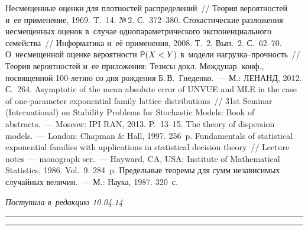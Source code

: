 \begin{multicols}{2}
{{\begin{thebibliography}{99}
 Несмещенные оценки
  для плотностей распределений~// Теория вероятностей и~ее применение,
  1969.  T.~14. №\,2.  С.~372--380.
 Стохастические разложения несмещенных оценок в~случае однопараметрического экспоненциального семейства~//
 Информатика и~её применения, 2008. Т.~2. Вып.~2. С.~62--70.
 О~несмещенной оценке вероятности
  ${\sf P}(X<Y)$ в~модели на\-груз\-ка--проч\-ность~//
  Теория вероятностей  и~ее приложения: Тезисы докл.
  Междунар. конф., посвященной 100-ле\-тию со дня
  рождения Б.\,В.~Гнеденко.~--- М.: ЛЕНАНД, 2012. С.~264.
 Asymptotic of the mean absolute error of UNVUE
 and MLE in the case of one-parameter exponential family lattice
 distributions~// 31st  Seminar (International) on Stability Problems for
 Stochastic Models: Book of abstracts.~--- Moscow: IPI RAN, 2013. P.~13--15.
 The theory of dispersion models.~---  London: Chapman \& Hall, 1997. 256~p.
 Fundamentals of statistical exponential
 families with applications in statistical decision theory~//
 Lecture notes~--- monograph ser.~--- 
 Hayward, CA, USA: Institute of Mathematical Statistics, 1986.  Vol.~9. 284~p.
 Предельные теоремы для сумм независимых случайных величин.~--- М.: Наука, 1987. 320~с.
 \end{thebibliography}

 }
 }

\end{multicols}

\vspace*{-9pt}

\hfill{\small\textit{Поступила в~редакцию 10.04.14}}


\vspace*{12pt}

\hrule

\vspace*{2pt}

\hrule


\def\tit{HIGHER-ORDER ASYMPTOTIC EXPANSIONS OF~UNBIASED ESTIMATORS AND~THEIR VARIANCES ON~THE~ONE-PARAMETER EXPONENTIAL FAMILY MODEL}

\def\titkol{Higher-order asymptotic expansions of unbiased estimators and
their variances on the one-parameter exponential family model}

